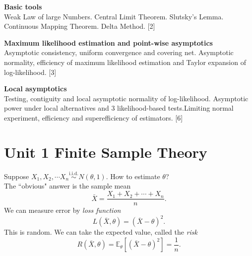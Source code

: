 \documentclass[a4paper]{article}
\begin{document}
{	\vspace{10pt}
	\noindent\textbf{Basic tools}\\
	Weak Law of large Numbers. Central Limit Theorem. Slutsky's Lemma. Continuous Mapping Theorem. Delta Method.\hspace*{\fill} [2]
	
	\vspace{10pt}
	\noindent\textbf{Maximum likelihood estimation and point-wise asymptotics}\\
	Asymptotic consistency, uniform convergence and covering net. Asymptotic normality, efficiency of maximum likelihood estimation and Taylor expansion of log-likelihood.\hspace*{\fill} [3]
	
	\vspace{10pt}
	\noindent\textbf{Local asymptotics}\\
	Testing, contiguity and local asymptotic normality of log-likelihood. Asymptotic power under local alternatives and 3 likelihood-based tests.Limiting normal experiment, efficiency and superefficiency of estimators.\hspace*{\fill} [6]}

\tableofcontents

\setcounter{section}{0}

\section*{Unit 1 Finite Sample Theory}

\begin{eg*}
	Suppose $X_1,X_2,\cdots X_n \stackrel{\text{i.i.d.}}{\sim} N(\theta,1)$. How to estimate $\theta$? \\
	The ``obvious" answer is the sample mean
	\begin{equation*}
		\bar{X} = \frac{X_1+X_2+\cdots+X_n}{n}.
	\end{equation*}
	We can measure error by \emph{loss function}
	\begin{equation*}
		L(\bar{X},\theta) = (\bar{X} - \theta)^2.
	\end{equation*}
	This is random. We can take the expected value, called the \emph{risk}
	\begin{equation*}
		R(\bar{X},\theta) = \mathbb{E}_{\theta}\left[(\bar{X}-\theta)^2\right] = \frac{1}{n}.
	\end{equation*}
\end{eg*}
\end{document}
